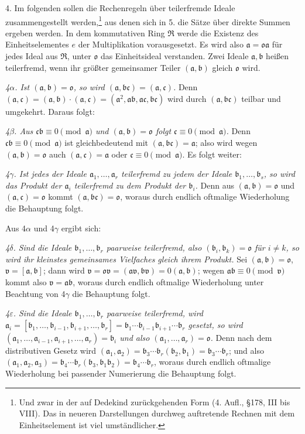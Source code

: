 \documentclass[11pt]{article}
\providecommand{\mR}{\mathfrak{R}}
\providecommand{\ma}{\mathfrak{a}}
\providecommand{\mb}{\mathfrak{b}}
\providecommand{\mc}{\mathfrak{c}}
\providecommand{\mo}{\mathfrak{o}}
\providecommand{\mv}{\mathfrak{v}}
\begin{document}
4. Im folgenden sollen die Rechenregeln über teilerfremde Ideale zusammengestellt werden,\footnote{Und zwar in der auf Dedekind zurückgehenden Form (4. Aufl., §178, III bis VIII). Das in neueren Darstellungen durchweg auftretende Rechnen mit dem Einheitselement ist viel umständlicher.} aus denen sich in 5. die Sätze über direkte Summen ergeben werden. In dem kommutativen Ring $\mR$ werde die Existenz des Einheitselementes $e$ der Multiplikation vorausgesetzt. Es wird also $\ma=\mo\ma$ für jedes Ideal aus $\mR$, unter $\mo$ das Einheitsideal verstanden. Zwei Ideale $\ma,\mb$ heißen teilerfremd, wenn ihr größter gemeinsamer Teiler $(\ma,\mb)$ gleich $\mo$ wird.

\emph{4$\alpha$. Ist $(\ma,\mb)=\mo$, so wird $(\ma,\mb\mc)=(\ma,\mc)$.} Denn $(\ma,\mc)=(\ma,\mb)\cdot(\ma,\mc)=(\ma^2,\ma\mb,\ma\mc,\mb\mc)$ wird durch $(\ma,\mb\mc)$ teilbar und umgekehrt. Daraus folgt:

\emph{4$\beta$. Aus $\mc\mb\equiv0\pmod{\ma}$ und $(\ma,\mb)=\mo$ folgt $\mc\equiv0\pmod{\ma}$.} Denn $\mc\mb\equiv0\pmod{\ma}$ ist gleichbedeutend mit $(\ma,\mb\mc)=\ma$; also wird wegen $(\ma,\mb)=\mo$ auch $(\ma,\mc)=\ma$ oder $\mc\equiv0\pmod{\ma}$. Es folgt weiter:

\emph{4$\gamma$. Ist jedes der Ideale $\ma_1,\ldots,\ma_r$ teilerfremd zu jedem der Ideale $\mb_1,\ldots,\mb_s$, so wird das Produkt der $\ma_i$ teilerfremd zu dem Produkt der $\mb_i$.} Denn aus $(\ma,\mb)=\mo$ und $(\ma,\mc)=\mo$ kommt $(\ma,\mb\mc)=\mo$, woraus durch endlich oftmalige Wiederholung die Behauptung folgt.

Aus 4$\alpha$ und 4$\gamma$ ergibt sich:

\emph{4$\delta$. Sind die Ideale $\mb_1,\ldots,\mb_r$ paarweise teilerfremd, also $(\mb_i,\mb_k)=\mo$ für $i\ne k$, so wird ihr kleinstes gemeinsames Vielfaches gleich ihrem Produkt.} Sei $(\ma,\mb)=\mo$, $\mv=[\ma,\mb]$; dann wird $\mv=\mo\mv=(\ma\mv,\mb\mv)=0(\ma,\mb)$; wegen $\ma\mb\equiv0\pmod{\mv}$ kommt also $\mv=\ma\mb$, woraus durch endlich oftmalige Wiederholung unter Beachtung von 4$\gamma$ die Behauptung folgt.

\emph{4$\varepsilon$. Sind die Ideale $\mb_1,\ldots,\mb_r$ paarweise teilerfremd, wird $\ma_i=[\mb_1,
\ldots,\mb_{i-1},\mb_{i+1},\ldots,\mb_r]=\mb_1\cdots\mb_{i-1}\mb_{i+1}\cdots\mb_r$ gesetzt, so wird $(\ma_1,\ldots,\ma_{i-1},\ma_{i+1},\ldots,\ma_r)=\mb_i$ und also $(\ma_1,
\ldots,\ma_r)=\mo$.} Denn nach dem distributiven Gesetz wird $(\ma_1,\ma_2)=\mb_3\cdots\mb_r(\mb_2,\mb_1)=\mb_3\cdots\mb_r$; und also $(\ma_1,\ma_2,\ma_3)=\mb_4\cdots\mb_r(\mb_3,\mb_1\mb_2)=\mb_4\cdots\mb_r$, woraus durch endlich oftmalige Wiederholung bei passender Numerierung die Behauptung folgt.
\end{document}
